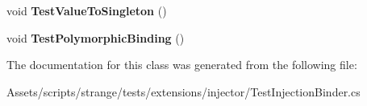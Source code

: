 \begin{DoxyCompactItemize}
\item 
\hypertarget{classstrange_1_1unittests_1_1_testinjection_binder_a56dd2b310693a50109af81546b5ea8c4}{void {\bfseries Test\-Value\-To\-Singleton} ()}\label{classstrange_1_1unittests_1_1_testinjection_binder_a56dd2b310693a50109af81546b5ea8c4}

\item 
\hypertarget{classstrange_1_1unittests_1_1_testinjection_binder_a4eb4902c49eda514348bc125f95216ca}{void {\bfseries Test\-Polymorphic\-Binding} ()}\label{classstrange_1_1unittests_1_1_testinjection_binder_a4eb4902c49eda514348bc125f95216ca}

\end{DoxyCompactItemize}


The documentation for this class was generated from the following file\-:\begin{DoxyCompactItemize}
\item 
Assets/scripts/strange/tests/extensions/injector/Test\-Injection\-Binder.\-cs\end{DoxyCompactItemize}
